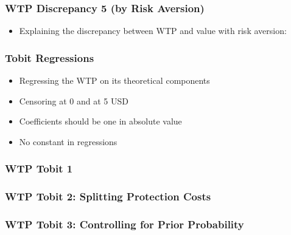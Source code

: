 \documentclass[11pt,hyperref={bookmarks=false}]{beamer}
\begin{document}
\begin{frame}
\frametitle{WTP Discrepancy 5 (by Risk Aversion)}
\begin{itemize}
\item Explaining the discrepancy between WTP and value with risk aversion:
\end{itemize}
\footnotesize

\end{frame}





\iffalse
\begin{frame}
\frametitle{Tobit Regressions}
\Large
\begin{itemize}
\item Regressing the WTP on its theoretical components
\item Censoring at 0 and at 5 USD
\item Coefficients should be one in absolute value
\item No constant in regressions
\end{itemize}
\normalsize
\end{frame}

\begin{frame}
\frametitle{WTP Tobit 1}

\footnotesize

\normalsize
\end{frame}


\begin{frame}
\frametitle{WTP Tobit 2: Splitting Protection Costs}

\footnotesize

\normalsize
\end{frame}


\begin{frame}
\frametitle{WTP Tobit 3: Controlling for Prior Probability}

\footnotesize

\normalsize
\end{frame}

\end{document}
